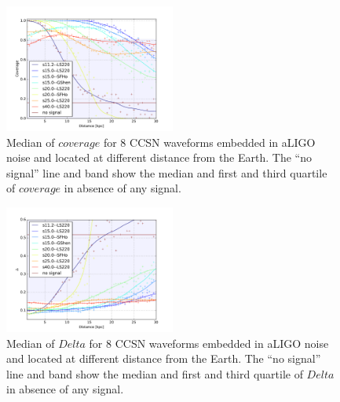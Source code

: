 \begin{figure}
  \centering
  \includegraphics[width=0.5\textwidth]{plots/aLIGO_coverage_allwvfs}
 \caption{Median of $coverage$ for 8 CCSN waveforms embedded in aLIGO noise and located at different distance from the Earth. The ``no signal'' line and band show the median and first and third quartile of $coverage$ in absence of any signal.} \label{fig:aLIGO_cov_allwvf}
\end{figure}

\begin{figure}
  \centering
  \includegraphics[width=0.5\textwidth]{plots/aLIGO_delta_allwvfs}
 \caption{Median of $Delta$ for 8 CCSN waveforms embedded in aLIGO noise and located at different distance from the Earth. The ``no signal'' line and band show the median and first and third quartile of $Delta$ in absence of any signal.} \label{fig:aLIGO_prec_allwvf}
\end{figure}


